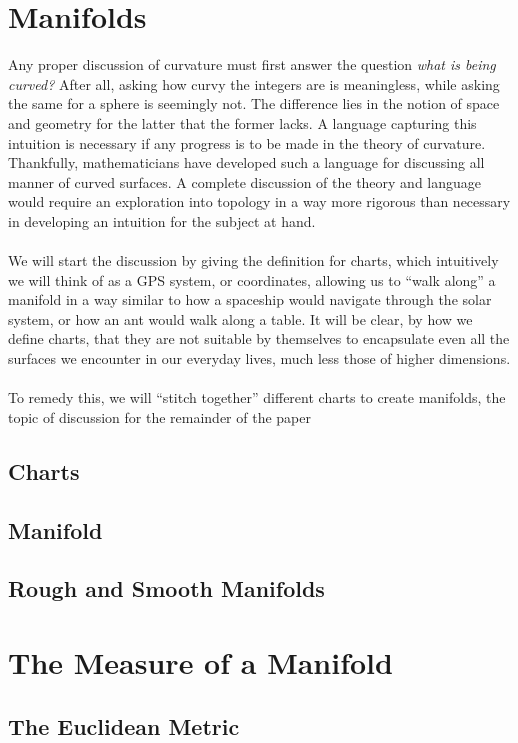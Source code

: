 \documentclass[]{article}
\newcommand\<{\ensuremath{\left\langle}}
\renewcommand\>{\ensuremath{\right\rangle}}
\begin{document}
	\section{Manifolds}
	Any proper discussion of curvature must first answer the question \textit{what is being curved?} After all, asking how curvy the integers are is meaningless, while asking the same for a sphere is seemingly not. The difference lies in the notion of space and geometry for the latter that the former lacks. A language capturing this intuition is necessary if any progress is to be made in the theory of curvature. Thankfully, mathematicians have developed such a language for discussing all manner of curved surfaces. A complete discussion of the theory and language would require an exploration into topology in a way more rigorous than necessary in developing an intuition for the subject at hand.\\
	\\
	We will start the discussion by giving the definition for charts, which intuitively we will think of as a GPS system, or coordinates, allowing us to ``walk along'' a manifold in a way similar to how a spaceship would navigate through the solar system, or how an ant would walk along a table. It will be clear, by how we define charts, that they are not suitable by themselves to encapsulate even all the surfaces we encounter in our everyday lives, much less those of higher dimensions. \\
	\\
	To remedy this, we will ``stitch together'' different charts to create manifolds, the topic of discussion for the remainder of the paper
	\subsection*{Charts}
	
	\subsection*{Manifold}
	
	\subsection*{Rough and Smooth Manifolds}
	
	\section{The Measure of a Manifold}
	\subsection*{The Euclidean Metric}
\end{document}
